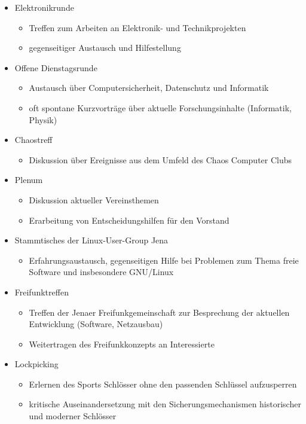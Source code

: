 \documentclass[10pt, a4paper]{scrartcl}
\begin{document}
\begin{itemize}
	\item Elektronikrunde
		\begin{itemize}
		    \item Treffen zum Arbeiten an Elektronik- und Technikprojekten
		    \item gegenseitiger Austausch und Hilfestellung
		\end{itemize}
	\item Offene Dienstagsrunde
		\begin{itemize}
			\item Austausch über Computersicherheit, Datenschutz und Informatik
			\item oft spontane Kurzvorträge über aktuelle Forschungsinhalte (Informatik, Physik)
		\end{itemize}
	\item Chaostreff
		\begin{itemize}
			\item Diskussion über Ereignisse aus dem Umfeld des Chaos Computer Clubs
		\end{itemize}
	\item Plenum
		\begin{itemize}
			\item Diskussion aktueller Vereinsthemen
			\item Erarbeitung von Entscheidungshilfen für den Vorstand
		\end{itemize}
	\item Stammtisches der Linux-User-Group Jena
		\begin{itemize}
			\item Erfahrungsaustausch, gegenseitigen Hilfe bei Problemen zum Thema freie Software und insbesondere GNU/Linux
		\end{itemize}
	\item Freifunktreffen
		\begin{itemize}
		    \item Treffen der Jenaer Freifunkgemeinschaft zur Besprechung der aktuellen Entwicklung (Software, Netzausbau)
		    \item Weitertragen des Freifunkkonzepts an Interessierte
		\end{itemize}
	\item Lockpicking
		\begin{itemize}
		    \item Erlernen des Sports Schlösser ohne den passenden Schlüssel aufzusperren
		    \item kritische Auseinandersetzung mit den Sicherungsmechanismen historischer und moderner Schlösser

\end{itemize}
\end{itemize}
\end{document}
